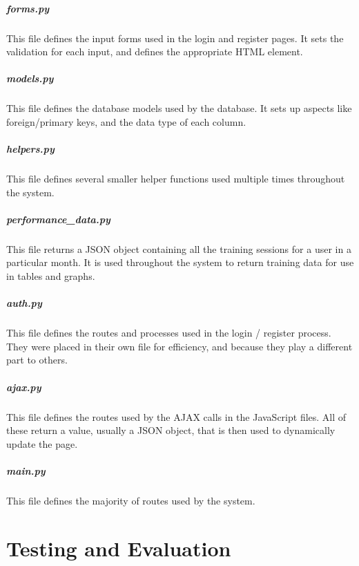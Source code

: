 \documentclass{article}[12pt,a4paper]
\begin{document}
\subsubsection{forms.py}
This file defines the input forms used in the login and register pages. It sets the validation for each input, and defines the appropriate HTML element.


\subsubsection{models.py}
This file defines the database models used by the database. It sets up aspects like foreign/primary keys, and the data type of each column.


\subsubsection{helpers.py}
This file defines several smaller helper functions used multiple times throughout the system.


\subsubsection{performance\_data.py}
This file returns a JSON object containing all the training sessions for a user in a particular month. It is used throughout the system to return training data for use in tables and graphs.


\subsubsection{auth.py}
This file defines the routes and processes used in the login / register process. They were placed in their own file for efficiency, and because they play a different part to others.


\subsubsection{ajax.py}
This file defines the routes used by the AJAX calls in the JavaScript files. All of these return a value, usually a JSON object, that is then used to dynamically update the page.


\subsubsection{main.py}
This file defines the majority of routes used by the system.


\cleardoublepage


\part{Testing and Evaluation}

\end{document}
